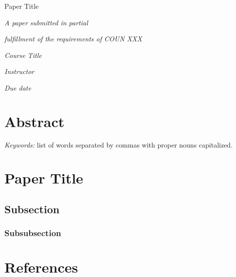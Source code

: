 \documentclass[12pt]{article}
\author{Author}
\title{\papertitle}
\newcommand{\papertitle}{Paper Title}
\newcommand{\coursetitle}{Course Title}
\newcommand{\instructor}{Instructor}
\newcommand{\duedate}{Due date}
\renewcommand{\maketitle}{
  \begin{center}
    \vspace*{150pt}

    \begin{singlespace}
      \papertitle

      \theauthor
    \end{singlespace}

    \vspace{50pt}

    \textit{A paper submitted in partial}

    \textit{fulfillment of the requirements of COUN XXX}

    \textit{\coursetitle}

    \textit{\instructor}

    \textit{\duedate}
  \end{center}
}
\begin{document}

\maketitle

\newpage



\section{Abstract}
\setlength{\parindent}{0in}

\lipsum[6]

\setlength{\parindent}{.5in}

\textit{Keywords:} list of words separated by commas with proper nouns capitalized.

\newpage



\section{\papertitle}

\lipsum[2]

\subsection{Subsection}

\lipsum[5]

\lipsum[3]

\subsubsection{Subsubsection}

\lipsum[5]

\lipsum[3]



\newpage
\section{References}
\end{document}
